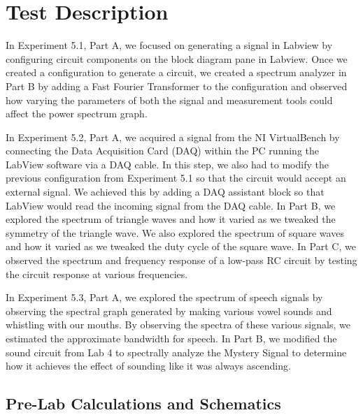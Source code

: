 \documentclass[10pt]{article}
\begin{document}
\medskip


\section{Test Description}

In Experiment 5.1, Part A, we focused on generating a signal in Labview by configuring circuit components on the block diagram pane in Labview. Once we created a configuration to generate a circuit, we created a spectrum analyzer in Part B by adding a Fast Fourier Transformer to the configuration and observed how varying the parameters of both the signal and measurement tools could affect the power spectrum graph. 

In Experiment 5.2, Part A, we acquired a signal from the NI VirtualBench by connecting the Data Acquisition Card (DAQ) within the PC running the LabView software via a DAQ cable. In this step, we also had to modify the previous configuration from Experiment 5.1 so that the circuit would accept an external signal. We achieved this by adding a DAQ assistant block so that LabView would read the incoming signal from the DAQ cable. In Part B, we explored the spectrum of triangle waves and how it varied as we tweaked the symmetry of the triangle wave. We also explored the spectrum of square waves and how it varied as we tweaked the duty cycle of the square wave. In Part C, we observed the spectrum and frequency response of a low-pass RC circuit by testing the circuit response at various frequencies. 

In Experiment 5.3, Part A, we explored the spectrum of speech signals by observing the spectral graph generated by making various vowel sounds and whistling with our mouths. By observing the spectra of these various signals, we estimated the approximate bandwidth for speech. In Part B, we modified the sound circuit from Lab 4 to spectrally analyze the Mystery Signal to determine how it achieves the effect of sounding like it was always ascending. 

\medskip


\subsection{Pre-Lab Calculations and Schematics}
\end{document}
